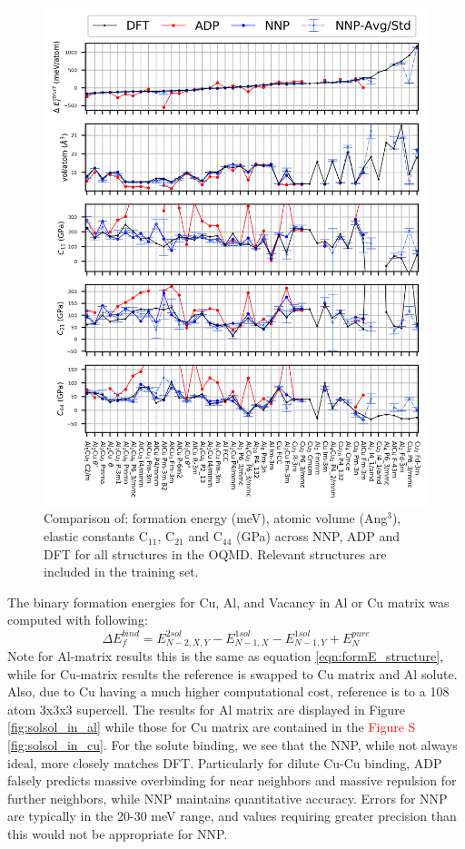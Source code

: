 \documentclass{article}
\begin{document}
\begin{figure}[H]%
\centering%
\includegraphics[width=1\textwidth,center]{figures/matparam_stats1.png}%
\caption{Comparison of: formation energy (meV), atomic volume (Ang$^3$), elastic constants C$_{11}$, C$_{21}$ and C$_{44}$ (GPa) across NNP, ADP and DFT for all structures in the OQMD. 
Relevant structures are included in the training set. }
\label{fig:matparam_stats1}
\end{figure}

The binary formation energies for Cu, Al, and Vacancy in Al or Cu matrix was computed with following:
\begin{equation}
\Delta E^{bind}_f = E^{2sol}_{N-2,X,Y}-E^{1sol}_{N-1,X}-E^{1sol}_{N-1,Y}+E^{pure}_N
\end{equation}
Note for Al-matrix results this is the same as equation \ref{eqn:formE_structure}, while for 
Cu-matrix results the reference is swapped to Cu matrix and Al solute.
Also, due to Cu having a much higher computational cost, reference is to a 108 atom 3x3x3 supercell.
The results for Al matrix are displayed in Figure \ref{fig:solsol_in_al} while those for Cu matrix are contained in the \textcolor{red}{Figure S \ref{fig:solsol_in_cu}}.
For the solute binding, we see that the NNP, while not always ideal, more closely matches DFT.
Particularly for dilute Cu-Cu binding, ADP falsely predicts massive overbinding for near neighbors and massive repulsion for further neighbors, while NNP maintains quantitative accuracy.
Errors for NNP are typically in the 20-30 meV range, and values requiring greater precision than this would not be appropriate for NNP.
\end{document}

